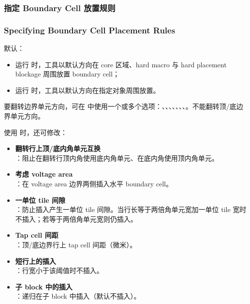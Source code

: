 \subsubsection{指定 Boundary Cell 放置规则}
\subsubsection*{Specifying Boundary Cell Placement Rules}

默认：
\begin{itemize}
  \item 运行  时，工具以默认方向在 core 区域、hard macro 与 hard placement blockage 周围放置 boundary cell；
  \item 运行  时，工具以默认方向在指定对象周围放置。
\end{itemize}

要翻转边界单元方向，可在  中使用一个或多个选项：、、、、、、、。不能翻转顶/底边界单元方向。

使用  时，还可修改：
\begin{itemize}
  \item \textbf{翻转行上顶/底内角单元互换}\\
        ：阻止在翻转行顶内角使用底内角单元、在底内角使用顶内角单元。
  \item \textbf{考虑 voltage area}\\
        ：在 voltage area 边界两侧插入水平 boundary cell。
  \item \textbf{一单位 tile 间隙}\\
        ：防止插入产生一单位 tile 间隙。当行长等于两倍角单元宽加一单位 tile 宽时不插入；若等于两倍角单元宽则仍插入。
  \item \textbf{Tap cell 间距}\\
        ：顶/底边界行上 tap cell 间距（微米）。
  \item \textbf{短行上的插入}\\
        ：行宽小于该阈值时不插入。
  \item \textbf{子 block 中的插入}\\
        ：递归在子 block 中插入（默认不插入）。
\end{itemize}

